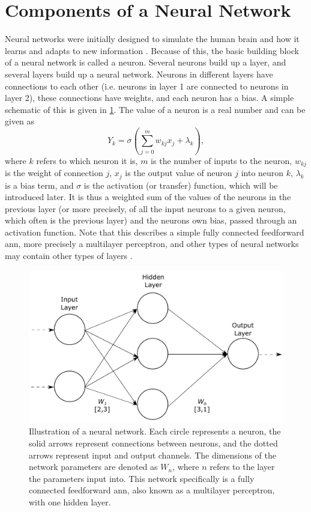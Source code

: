 \section{Components of a Neural Network}
\label{sec:ml:componentsofaneuralnetwork}
Neural networks were initially designed to simulate the human brain and how it learns and adapts to new information \cite{McCulloch1943}. Because of this, the basic building block of a neural network is called a neuron. Several neurons build up a layer, and several layers build up a neural network. Neurons in different layers have connections to each other (i.e. neurons in layer 1 are connected to neurons in layer 2), these connections have weights, and each neuron has a bias. A simple schematic of this is given in \cref{fig:neuralnetwork}. The value of a neuron is a real number and can be given as \cite[81]{Wang2003}
\begin{equation}
    \label{eq:neuron}
    Y_{k} = \sigma\left(\sum_{j=0}^{m}w_{kj}x_j + \lambda_k \right),
\end{equation}
where $k$ refers to which neuron it is, $m$ is the number of inputs to the neuron, $w_{kj}$ is the weight of connection $j$, $x_j$ is the output value of neuron $j$ into neuron $k$, $\lambda_k$ is a bias term, and $\sigma$ is the activation (or transfer) function, which will be introduced later. It is thus a weighted sum of the values of the neurons in the previous layer (or more precisely, of all the input neurons to a given neuron, which often is the previous layer) and the neurons own bias, passed through an activation function. Note that this describes a simple fully connected feedforward \gls{ann}, more precisely a multilayer perceptron, and other types of neural networks may contain other types of layers \cite{Wang2003}. 

\begin{figure}[htbp]  
    \centering
    \includegraphics[width=.8\textwidth]{figures/neuralnetwork.pdf}
    \caption[Illustration of a neural network]{Illustration of a neural network. Each circle represents a neuron, the solid arrows represent connections between neurons, and the dotted arrows represent input and output channels. The dimensions of the network parameters are denoted as $W_n$, where $n$ refers to the layer the parameters input into. This network specifically is a fully connected feedforward \gls{ann}, also known as a multilayer perceptron, with one hidden layer. }
    \label{fig:neuralnetwork}
\end{figure}

